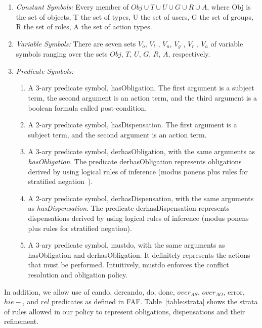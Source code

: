 \documentclass[12pt,journal,letterpaper,onecolumn]{IEEEtran}
\begin{document}
\begin{enumerate}
\item {\em Constant Symbols:} Every member of
$Obj \cup T \cup U \cup G \cup R \cup A$, where Obj is the set of
objects, T the set of types, U the set of users, G the set of
groups, R the set of roles, A the set of action types.
\item {\em Variable Symbols:} There are seven sets $V_o$, $V_t$ ,
$V_u$, $V_g$ , $V_r$ , $V_{a}$ of variable symbols ranging over the
sets $Obj$, $T$, $U$, $G$, $R$, $A$, respectively. \item {\em
Predicate Symbols:}
    \begin{enumerate}
    \item A 3-ary predicate symbol, {\ttfamily hasObligation}. The first argument is
    a subject term, the second argument is an action term,
    and the third argument is a boolean formula called post-condition.
    \item A 2-ary predicate symbol, {\ttfamily hasDispensation}. The first argument
    is a subject term, and the second argument is an action term.
    \item A 3-ary predicate symbol, {\ttfamily derhasObligation}, with the same arguments
    as {\em hasObligation}. The predicate {\ttfamily derhasObligation} represents obligations
    derived by using logical rules of inference
    (modus ponens plus rules for stratified negation~\cite{Apt88}).
    \item A 2-ary predicate symbol, {\ttfamily derhasDispensation}, with the same arguments
    as {\em hasDispensation}. The predicate {\ttfamily derhasDispensation} represents
    dispensations derived by using logical rules of inference
    (modus ponens plus rules for stratified negation).
    \item A 3-ary predicate symbol, {\ttfamily mustdo}, with the same arguments
    as {\ttfamily hasObligation} and {\ttfamily derhasObligation}. It definitely represents
    the actions that must be performed. Intuitively, {\ttfamily mustdo} enforces the conflict
    resolution and obligation policy.
    \end{enumerate}
\end{enumerate}

In addition, we allow use of {\ttfamily cando, dercando, do, done,
$over_{AS}$, $over_{AO}$, error}, $hie-$, and $rel$ predicates as
defined in FAF. Table~\ref{table:strata} shows the strata of rules
allowed in our policy to represent obligations, dispensations and
their refinement.
\end{document}
